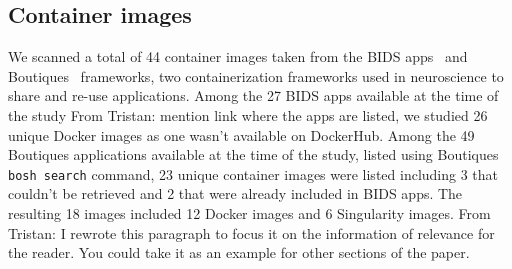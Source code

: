 \documentclass[a4paper,num-refs]{oup-contemporary}
\newcommand{\tristan}[1]{\color{blue}From Tristan: #1\color{black}}
\begin{document}
%
%
\subsection{Container images}

We scanned a total of 44 container images taken from the BIDS
apps~\cite{gorgolewski2017bids} and Boutiques~\cite{glatard2018boutiques}
frameworks, two containerization frameworks used in neuroscience to share
and re-use applications. Among the 27 BIDS apps available at the time of
the study \tristan{mention link where the apps are listed}, we studied 26
unique Docker images as one wasn't available on DockerHub. Among the 49
Boutiques applications available at the time of the study, listed using
Boutiques \texttt{bosh search} command, 23 unique container images were
listed including 3 that couldn't be retrieved and 2 that were already
included in BIDS apps. The resulting 18 images included 12 Docker images
and 6 Singularity images.
\tristan{I rewrote this paragraph to focus it on the information of relevance for the reader. 
You could take it as an example for other sections of the paper.}
\end{document}
